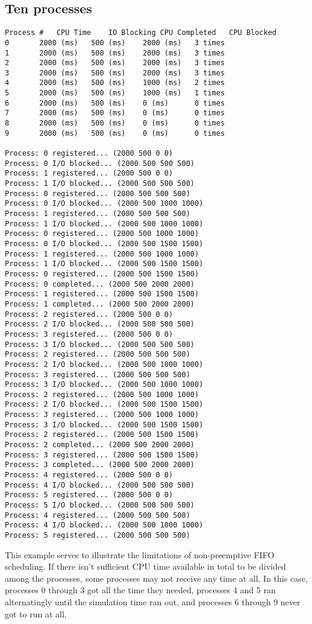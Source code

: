 \documentclass{article}
\begin{document}
	\subsection{Ten processes}
	
	\begin{verbatim}
Process #	CPU Time	IO Blocking	CPU Completed	CPU Blocked
0		2000 (ms)	500 (ms)	2000 (ms)	3 times
1		2000 (ms)	500 (ms)	2000 (ms)	3 times
2		2000 (ms)	500 (ms)	2000 (ms)	3 times
3		2000 (ms)	500 (ms)	2000 (ms)	3 times
4		2000 (ms)	500 (ms)	1000 (ms)	2 times
5		2000 (ms)	500 (ms)	1000 (ms)	1 times
6		2000 (ms)	500 (ms)	0 (ms)		0 times
7		2000 (ms)	500 (ms)	0 (ms)		0 times
8		2000 (ms)	500 (ms)	0 (ms)		0 times
9		2000 (ms)	500 (ms)	0 (ms)		0 times

Process: 0 registered... (2000 500 0 0)
Process: 0 I/O blocked... (2000 500 500 500)
Process: 1 registered... (2000 500 0 0)
Process: 1 I/O blocked... (2000 500 500 500)
Process: 0 registered... (2000 500 500 500)
Process: 0 I/O blocked... (2000 500 1000 1000)
Process: 1 registered... (2000 500 500 500)
Process: 1 I/O blocked... (2000 500 1000 1000)
Process: 0 registered... (2000 500 1000 1000)
Process: 0 I/O blocked... (2000 500 1500 1500)
Process: 1 registered... (2000 500 1000 1000)
Process: 1 I/O blocked... (2000 500 1500 1500)
Process: 0 registered... (2000 500 1500 1500)
Process: 0 completed... (2000 500 2000 2000)
Process: 1 registered... (2000 500 1500 1500)
Process: 1 completed... (2000 500 2000 2000)
Process: 2 registered... (2000 500 0 0)
Process: 2 I/O blocked... (2000 500 500 500)
Process: 3 registered... (2000 500 0 0)
Process: 3 I/O blocked... (2000 500 500 500)
Process: 2 registered... (2000 500 500 500)
Process: 2 I/O blocked... (2000 500 1000 1000)
Process: 3 registered... (2000 500 500 500)
Process: 3 I/O blocked... (2000 500 1000 1000)
Process: 2 registered... (2000 500 1000 1000)
Process: 2 I/O blocked... (2000 500 1500 1500)
Process: 3 registered... (2000 500 1000 1000)
Process: 3 I/O blocked... (2000 500 1500 1500)
Process: 2 registered... (2000 500 1500 1500)
Process: 2 completed... (2000 500 2000 2000)
Process: 3 registered... (2000 500 1500 1500)
Process: 3 completed... (2000 500 2000 2000)
Process: 4 registered... (2000 500 0 0)
Process: 4 I/O blocked... (2000 500 500 500)
Process: 5 registered... (2000 500 0 0)
Process: 5 I/O blocked... (2000 500 500 500)
Process: 4 registered... (2000 500 500 500)
Process: 4 I/O blocked... (2000 500 1000 1000)
Process: 5 registered... (2000 500 500 500)
    \end{verbatim}
	
	This example serves to illustrate the limitations of non-preemptive FIFO
	scheduling. If there isn't sufficient CPU time available in total to be
	divided among the processes, some processes may not receive any time at all.
	In this case, processes 0 through 3 got all the time they needed,
	processes 4 and 5 ran alternatingly until the simulation time ran out, and
	processes 6 through 9 never got to run at all.
    
\end{document}
